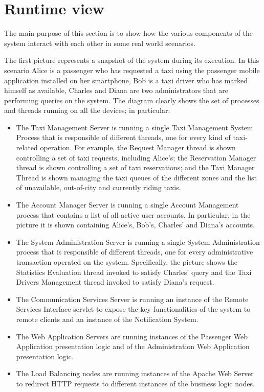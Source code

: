 \section{Runtime view}
The main purpose of this section is to show how the various components of the system interact with each other in some real world scenarios.

The first picture represents a snapshot of the system during its execution. In this scenario Alice is a passenger who has requested a taxi using the passenger mobile application installed on her smartphone, Bob is a taxi driver who has marked himself as available, Charles and Diana are two administrators that are performing queries on the system. The diagram clearly shows the set of processes and threads running on all the devices; in particular:
\begin{itemize}
	\item The Taxi Management Server is running a single Taxi Management System Process that is responsible of different threads, one for every kind of taxi-related operation. For example, the Request Manager thread is shown controlling a set of taxi requests, including Alice's; the Reservation Manager thread is shown controlling a set of taxi reservations; and the Taxi Manager Thread is shown managing the taxi queues of the different zones and the list of unavailable, out-of-city and currently riding taxis.
	\item The Account Manager Server is running a single Account Management process that contains a list of all active user accounts. In particular, in the picture it is shown containing Alice's, Bob's, Charles' and Diana's accounts.
	\item The System Administration Server is running a single System Administration process that is responsible of different threads, one for every administrative transaction operated on the system. Specifically, the picture shows the Statistics Evaluation thread invoked to satisfy Charles' query and the Taxi Drivers Management thread invoked to satisfy Diana's request.
	\item The Communication Services Server is running an instance of the Remote Services Interface servlet to expose the key functionalities of the system to remote clients and an instance of the Notification System.
	\item The Web Application Servers are running instances of the Passenger Web Application presentation logic and of the Administration Web Application presentation logic.
	\item The Load Balancing nodes are running instances of the Apache Web Server to redirect HTTP requests to different instances of the business logic nodes.
\end{itemize}

